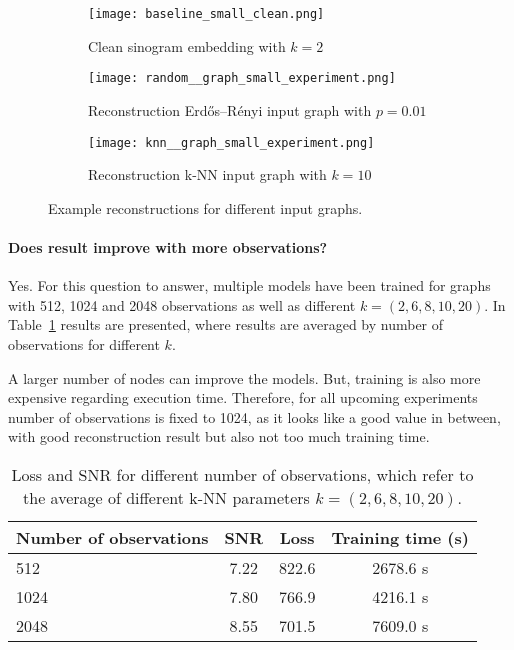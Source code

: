 \begin{figure}[H]
  \captionsetup[subfigure]{justification=centering}
  \centering
  \begin{subfigure}[t]{0.3\textwidth}
      \texttt{[image: baseline\_small\_clean.png]}
      \caption{Clean sinogram embedding with $k=2$}
      \label{fig:small_experiment_clean2}
  \end{subfigure}\hfill
  \begin{subfigure}[t]{0.3\textwidth}
    \texttt{[image: random\_\_graph\_small\_experiment.png]}
    \caption{Reconstruction Erdős–Rényi input graph with $p=0.01$}
    \label{fig:small_experiment_random_graph}
  \end{subfigure}\hfill
  \begin{subfigure}[t]{0.3\textwidth}
    \texttt{[image: knn\_\_graph\_small\_experiment.png]}
    \caption{Reconstruction k-NN input graph with $k=10$}
    \label{fig:small_experiment_knn_graph}
  \end{subfigure}
  \caption{Example reconstructions for different input graphs.}
  \label{fig:input_graph_small}
\end{figure}



  \paragraph{Does result improve with more observations?}
  Yes.
  For this question to answer, multiple models have been trained for graphs with 512, 1024 and 2048 observations
  as well as different $k = (2,6,8,10,20)$.
  In Table~\ref{tab:graph_knn} results are presented, where results are averaged by number of observations 
  for different $k$.

  A larger number of nodes can improve the models. 
  But, training is also more expensive regarding execution time. 
  Therefore, for all upcoming experiments number of observations is fixed to 1024, as it looks like a good
  value in between, with good reconstruction result but also not too much training time.
  
  \begin{table}[H]
    \centering
      \begin{tabular}{l|ccc}
      \toprule
      \textbf{Number of observations} & \textbf{SNR} & \textbf{Loss} & \textbf{Training time (s)}  \\ 
      \midrule
      512  &  7.22    &  822.6  & 2678.6 s \\ \hline
      1024 &  7.80    &  766.9 & 4216.1 s \\ \hline
      2048 &  8.55    &  701.5 & 7609.0 s  \\ \hline
      \midrule
      \end{tabular}
    \caption{Loss and SNR for different number of observations, which refer to the average of 
    different k-NN parameters $k = (2,6,8,10,20)$.}
    \label{tab:graph_knn}
  \end{table}

